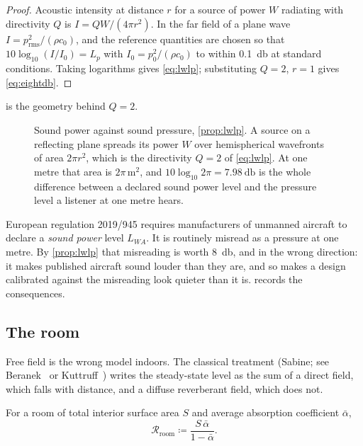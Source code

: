 \begin{proof}
Acoustic intensity at distance $r$ for a source of power $W$ radiating with
directivity $Q$ is $I = QW/(4\pi r^2)$. In the far field of a plane wave
$I = p_{\mathrm{rms}}^2/(\rho c_0)$, and the reference quantities are chosen so
that $10\log_{10}(I/I_0) = L_p$ with $I_0 = p_0^2/(\rho c_0)$ to within
\SI{0.1}{\decibel} at standard conditions. Taking logarithms gives
\cref{eq:lwlp}; substituting $Q=2$, $r=1$ gives \cref{eq:eightdb}.
\end{proof}

 is the geometry behind $Q=2$.

\begin{figure}[tbp]
\centering

\caption{Sound power against sound pressure, \cref{prop:lwlp}. A source on a
reflecting plane spreads its power $W$ over hemispherical wavefronts of area
$2\pi r^2$, which is the directivity $Q=2$ of \cref{eq:lwlp}. At one metre that
area is $2\pi\,\si{\metre\squared}$, and $10\log_{10}2\pi=\SI{7.98}{\decibel}$
is the whole difference between a declared sound power level and the pressure
level a listener at one metre hears.}
\label{fig:hemisphere}
\end{figure}

\begin{remark}
European regulation 2019/945 requires manufacturers of unmanned aircraft to
declare a \emph{sound power} level $L_{WA}$. It is routinely misread as a
pressure at one metre. By \cref{prop:lwlp} that misreading is worth
\SI{8}{\decibel}, and in the wrong direction: it makes published aircraft sound
louder than they are, and so makes a design calibrated against the misreading
look quieter than it is.  records the consequences.
\end{remark}

\subsection{The room}

Free field is the wrong model indoors. The classical treatment
(Sabine; see Beranek~\cite{beranek1988} or Kuttruff~\cite{kuttruff2009}) writes
the steady-state level as the sum of a direct field, which falls with distance,
and a diffuse reverberant field, which does not.

\begin{definition}
For a room of total interior surface area $S$ and average absorption
coefficient $\bar\alpha$,
\begin{equation}
  \mathcal{R}_{\mathrm{room}} \coloneqq \frac{S\,\bar\alpha}{1-\bar\alpha} .
  \label{eq:roomconstant}
\end{equation}
\end{definition}

